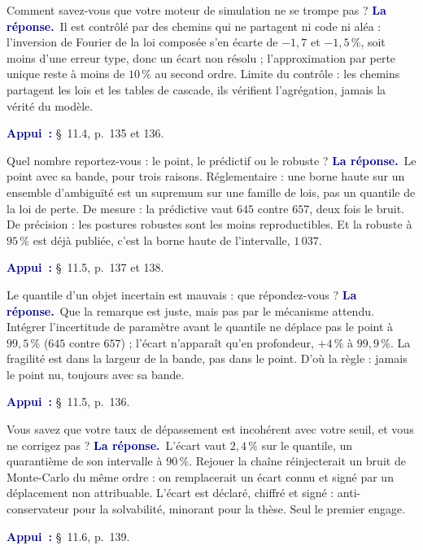 \documentclass[11pt,a4paper]{article}
\newcommand{\rep}[1]{\smallskip\noindent\textcolor{navy}{\textbf{La réponse.}}\ #1\par}
\newcommand{\appui}[1]{\smallskip\noindent\small\textcolor{navy}{\textbf{Appui~:}} #1\par\normalsize}
\begin{document}
\begin{question}{\og Comment savez-vous que votre moteur de simulation ne se trompe pas ?\fg{}}
\rep{Il est contrôlé par des chemins qui ne partagent ni code ni aléa : l'inversion de Fourier de la
loi composée s'en écarte de $-1{,}7$ et $-1{,}5\,\%$, soit moins d'une erreur type, donc un écart non
résolu ; l'approximation par perte unique reste à moins de $10\,\%$ au second ordre. Limite du
contrôle : les chemins partagent les lois et les tables de cascade, ils vérifient l'agrégation,
jamais la vérité du modèle.}
\appui{\S~11.4, p.~135 et 136.}
\end{question}

\begin{question}{\og Quel nombre reportez-vous : le point, le prédictif ou le robuste ?\fg{}}
\rep{Le point avec sa bande, pour trois raisons. Réglementaire : une borne haute sur un ensemble
d'ambiguïté est un supremum sur une famille de lois, pas un quantile de la loi de perte. De mesure :
la prédictive vaut $645$ contre $657$, deux fois le bruit. De précision : les postures robustes
sont les moins reproductibles. Et la robuste à $95\,\%$ est déjà publiée, c'est la borne haute de
l'intervalle, $1\,037$.}
\appui{\S~11.5, p.~137 et 138.}
\end{question}

\begin{question}{\og \og Le quantile d'un objet incertain est mauvais\fg{} : que répondez-vous ?\fg{}}
\rep{Que la remarque est juste, mais pas par le mécanisme attendu. Intégrer l'incertitude de
paramètre avant le quantile ne déplace pas le point à $99{,}5\,\%$ ($645$ contre $657$) ; l'écart
n'apparaît qu'en profondeur, $+4\,\%$ à $99{,}9\,\%$. La fragilité est dans la largeur de la bande,
pas dans le point. D'où la règle : jamais le point nu, toujours avec sa bande.}
\appui{\S~11.5, p.~136.}
\end{question}

\begin{question}{\og Vous savez que votre taux de dépassement est incohérent avec votre seuil, et vous ne corrigez pas ?\fg{}}
\rep{L'écart vaut $2{,}4\,\%$ sur le quantile, un quarantième de son intervalle à $90\,\%$. Rejouer
la chaîne réinjecterait un bruit de Monte-Carlo du même ordre : on remplacerait un écart connu et
signé par un déplacement non attribuable. L'écart est déclaré, chiffré et signé : anti-conservateur
pour la solvabilité, minorant pour la thèse. Seul le premier engage.}
\appui{\S~11.6, p.~139.}
\end{question}
\end{document}
